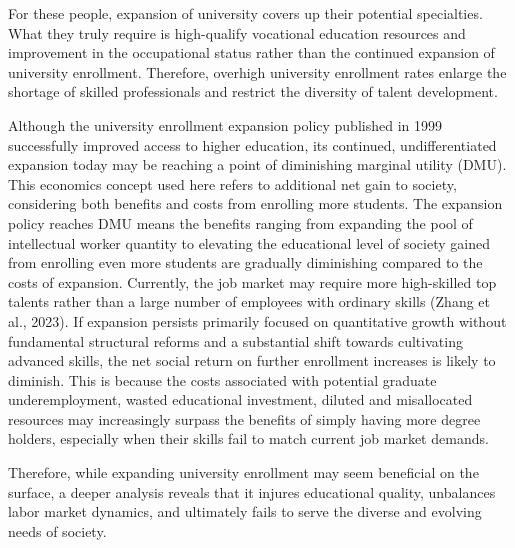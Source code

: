 \documentclass{studentpaper}
\begin{document}
For these people, expansion of university covers up their potential specialties. 
What they truly require is high-qualify vocational education resources and improvement in the occupational status rather than the continued expansion of university enrollment. 
Therefore, overhigh university enrollment rates enlarge the shortage of skilled professionals and restrict the diversity of talent development.
\par
Although the university enrollment expansion policy published in 1999 successfully improved access to higher education, its continued, undifferentiated expansion today may be reaching a point of diminishing marginal utility (DMU). 
This economics concept used here refers to additional net gain to society, considering both benefits and costs from enrolling more students. 
The expansion policy reaches DMU means the benefits ranging from expanding the pool of intellectual worker quantity to elevating the educational level of society gained from enrolling even more students are gradually diminishing compared to the costs of expansion. 
Currently, the job market may require more high-skilled top talents rather than a large number of employees with ordinary skills (Zhang et al., 2023). 
If expansion persists primarily focused on quantitative growth without fundamental structural reforms and a substantial shift towards cultivating advanced skills, the net social return on further enrollment increases is likely to diminish. 
This is because the costs associated with potential graduate underemployment, wasted educational investment, diluted and misallocated resources may increasingly surpass the benefits of simply having more degree holders, especially when their skills fail to match current job market demands.
\par
Therefore, while expanding university enrollment may seem beneficial on the surface, a deeper analysis reveals that it injures educational quality, unbalances labor market dynamics, and ultimately fails to serve the diverse and evolving needs of society.



\end{document}
